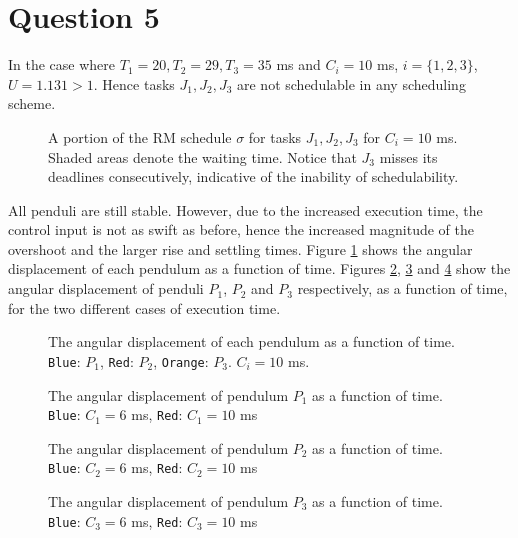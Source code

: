 \section{Question 5}
In the case where $T_1 = 20, T_2 = 29, T_3 = 35$ ms and $C_i = 10$ ms,
$i=\{1,2,3\}$, $U=1.131 > 1$. Hence tasks $J_1, J_2, J_3$ are not schedulable
in any scheduling scheme.


\begin{figure}[H]\centering
  \scalebox{0.7}{}
  \caption{A portion of the RM schedule $\sigma$ for tasks $J_1, J_2, J_3$ for
    $C_i = 10$ ms.  Shaded areas denote the waiting time. Notice that $J_3$
    misses its deadlines consecutively, indicative of the inability of
    schedulability.}
\end{figure}

All penduli are still stable. However, due to the increased execution time, the
control input is not as swift as before, hence the increased magnitude of the
overshoot and the larger rise and settling times.
Figure \ref{fig:5.2} shows the angular displacement of each pendulum as a
function of time.
Figures \ref{fig:5.6_10.1}, \ref{fig:5.6_10.2} and \ref{fig:5.6_10.3} show
the angular displacement of penduli $P_1$, $P_2$ and $P_3$ respectively, as a
function of time, for the two different cases of execution time.

\begin{figure}[H]\centering
  \scalebox{1}{}
  \caption{The angular displacement of each pendulum as a function of time.
    \texttt{Blue}: $P_1$, \texttt{Red}: $P_2$, \texttt{Orange}: $P_3$.
    $C_i = 10$ ms.}
  \label{fig:5.2}
\end{figure}

\begin{figure}[H]\centering
  \scalebox{1}{}
  \caption{The angular displacement of pendulum $P_1$ as a function of time.
    \texttt{Blue}: $C_1 = 6$ ms, \texttt{Red}: $C_1 = 10$ ms}
  \label{fig:5.6_10.1}
\end{figure}

\begin{figure}[H]\centering
  \scalebox{1}{}
  \caption{The angular displacement of pendulum $P_2$ as a function of time.
    \texttt{Blue}: $C_2 = 6$ ms, \texttt{Red}: $C_2 = 10$ ms}
  \label{fig:5.6_10.2}
\end{figure}

\begin{figure}[H]\centering
  \scalebox{1}{}
  \caption{The angular displacement of pendulum $P_3$ as a function of time.
    \texttt{Blue}: $C_3 = 6$ ms, \texttt{Red}: $C_3 = 10$ ms}
  \label{fig:5.6_10.3}
\end{figure}

